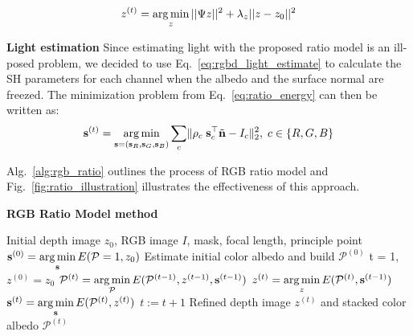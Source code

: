 \begin{equation}\label{eq:ratio_depth_refine}
    z^{(t)}= \operatorname*{arg\,min}_{z}  ||\Psi z||^2 + \lambda_z||z - z_0||^2
\end{equation}

\textbf{Light estimation}
Since estimating light with the proposed ratio model is an ill-posed problem, we decided to use Eq.~\ref{eq:rgbd_light_estimate} to calculate the SH parameters for each channel when the albedo and the surface normal are freezed. The minimization problem from Eq.~\ref{eq:ratio_energy} can then be written as:
\begin{equation}\label{eq:ratio_light_estimate}
    \mathbf{s}^{(t)} = \operatorname*{arg\,min}_{\mathbf{s} = (\mathbf{s}_R, \mathbf{s}_G, \mathbf{s}_B)}\sum_{c} \lVert \rho_c \; \mathbf{s}_c^\top \tilde{\mathbf{n}} - I_c\rVert^2_2, \; c\in\{R,G,B\}
\end{equation}

Alg.~\ref{alg:rgb_ratio} outlines the process of RGB ratio model and Fig.~\ref{fig:ratio_illustration} illustrates the effectiveness of this approach.

\begin{algorithm}[!htbp]
    \begin{algorithmic}[1]
          \caption{\textbf{RGB Ratio Model method}}
        \label{alg:rgb_ratio}
         \renewcommand{\algorithmicrequire}{\textbf{Input:}}
         \renewcommand{\algorithmicensure}{\textbf{Output:}}
         \REQUIRE Initial depth image $z_0$, RGB image $I$, mask, focal length, principle point
         \vspace{1.8mm}
         \STATE $\mathbf{s}^{(0)} = \operatorname*{arg\,min} \limits_{\mathbf{s}} E(\mathcal{P} =1, z_0)$ 
         \STATE Estimate initial color albedo and build $\mathcal{P}^{(0)}$  
         \STATE t = 1, $z^{(0)} = z_0$
         \vspace{1.8mm}
           \vspace{1.8mm}
            \STATE $\mathcal{P}^{(t)} = \operatorname*{arg\,min} \limits_{\mathcal{P}} E(\mathcal{P}^{(t-1)}, z^{(t-1)}, \mathbf{s}^{(t-1)})$ 
              \STATE $z^{(t)} = \operatorname*{arg\,min} \limits_{z} E(\mathcal{P}^{(t)}, \mathbf{s}^{(t-1)})$ 
              \STATE $\mathbf{s}^{(t)} = \operatorname*{arg\,min} \limits_{\mathbf{s}} E(\mathcal{P}^{(t)}, z^{(t)})$ 
              \vspace{1.8mm}
                  \STATE $t := t + 1$
         \vspace{1.8mm}
          \ENDWHILE
          \ENSURE  Refined depth image $z^{(t)}$ and stacked color albedo $\mathcal{P}^{(t)}$
    \end{algorithmic}
\end{algorithm}

